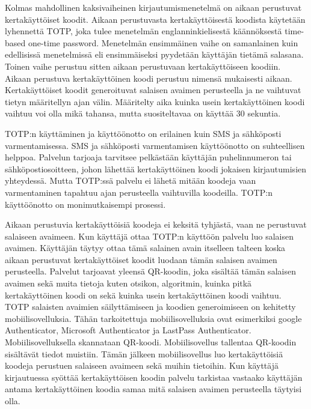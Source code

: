 Kolmas mahdollinen kaksivaiheinen kirjautumismenetelmä on aikaan perustuvat kertakäyttöiset koodit. Aikaan perustuvasta kertakäyttöisestä koodista käytetään lyhennettä TOTP, joka tulee menetelmän englanninkielisestä käännöksestä time-based one-time password. Menetelmän ensimmäinen vaihe on samanlainen kuin edellisissä menetelmissä eli ensimmäiseksi pyydetään käyttäjän tietämä salasana. Toinen vaihe perustuu sitten aikaan perustuvaan kertakäyttöiseen koodiin. Aikaan perustuva kertakäyttöinen koodi perustuu nimensä mukaisesti aikaan. Kertakäyttöiset koodit generoituvat salaisen avaimen perusteella ja ne vaihtuvat tietyn määritellyn ajan välin. Määritelty aika kuinka usein kertakäyttöinen koodi vaihtuu voi olla mikä tahansa, mutta suositeltavaa on käyttää 30 sekuntia. \citep{m2011totp} \citep{NIST_800_63B}

TOTP:n käyttäminen ja käyttöönotto on erilainen kuin SMS ja sähköposti varmentamisessa. SMS ja sähköposti varmentamisen käyttöönotto on suhteellisen helppoa. Palvelun tarjoaja tarvitsee pelkästään käyttäjän puhelinnumeron tai sähköpostiosoitteen, johon lähettää kertakäyttöinen koodi jokaisen kirjautumisien yhteydessä. Mutta TOTP:ssä palvelu ei lähetä mitään koodeja vaan varmentaminen tapahtuu ajan perusteella vaihtuvilla koodeilla. TOTP:n käyttöönotto on monimutkaisempi prosessi.

Aikaan perustuvia kertakäyttöisiä koodeja ei keksitä tyhjästä, vaan ne perustuvat salaiseen avaimeen. Kun käyttäjä ottaa TOTP:n käyttöön palvelu luo salaisen avaimen. Käyttäjän täytyy ottaa tämä salainen avain itselleen talteen koska aikaan perustuvat kertakäyttöiset koodit luodaan tämän salaisen avaimen perusteella. Palvelut tarjoavat yleensä QR-koodin, joka sisältää tämän salaisen avaimen sekä muita tietoja kuten otsikon, algoritmin, kuinka pitkä kertakäyttöinen koodi on sekä kuinka usein kertakäyttöinen koodi vaihtuu. TOTP salaisten avaimien säilyttämiseen ja koodien generoimiseen on kehitetty mobiilisovelluksia. Tähän tarkoitettuja mobiilisovelluksia ovat esimerkiksi google Authenticator, Microsoft Authenticator ja LastPass Authenticator. \citep{best_authenticator_apps} Mobiilisovelluksella skannataan QR-koodi. Mobiilisovellus tallentaa QR-koodin sisältävät tiedot muistiin. Tämän jälkeen mobiilisovellus luo kertakäyttöisiä koodeja perustuen salaiseen avaimeen sekä muihin tietoihin. Kun käyttäjä kirjautuessa syöttää kertakäyttöisen koodin palvelu tarkistaa vastaako käyttäjän antama kertakäyttöinen koodia samaa mitä salaisen avaimen perusteella täytyisi olla.



